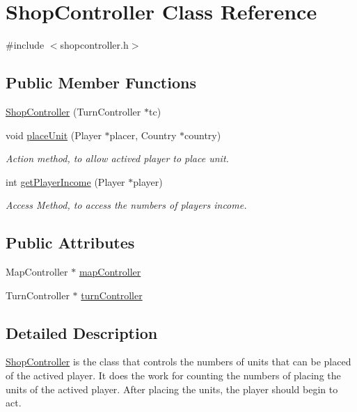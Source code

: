 \hypertarget{class_shop_controller}{}\section{Shop\+Controller Class Reference}
\label{class_shop_controller}


{\ttfamily \#include $<$shopcontroller.\+h$>$}

\subsection*{Public Member Functions}
\begin{DoxyCompactItemize}
\item 
\hyperlink{class_shop_controller_a02945177e65fca47c9cddee1a7b3fdb6}{Shop\+Controller} (Turn\+Controller $\ast$tc)
\item 
void \hyperlink{class_shop_controller_a6f1f54172f914d26432bee8cf2f888ed}{place\+Unit} (Player $\ast$placer, Country $\ast$country)
\begin{DoxyCompactList}\small\item\em Action method, to allow actived player to place unit. \end{DoxyCompactList}\item 
int \hyperlink{class_shop_controller_acca2acc6d4aa2ad91db60f8461e74ad1}{get\+Player\+Income} (Player $\ast$player)
\begin{DoxyCompactList}\small\item\em Access Method, to access the numbers of player\textquotesingle{}s income. \end{DoxyCompactList}\end{DoxyCompactItemize}
\subsection*{Public Attributes}
\begin{DoxyCompactItemize}
\item 
Map\+Controller $\ast$ \hyperlink{class_shop_controller_a44304a0e1de2f28cdcce75b9ae265a83}{map\+Controller}
\item 
Turn\+Controller $\ast$ \hyperlink{class_shop_controller_a3d14a370bf604d6f52f3a94749dd1913}{turn\+Controller}
\end{DoxyCompactItemize}


\subsection{Detailed Description}
\hyperlink{class_shop_controller}{Shop\+Controller} is the class that controls the numbers of units that can be placed of the actived player. It does the work for counting the numbers of placing the units of the actived player. After placing the units, the player should begin to act. 

